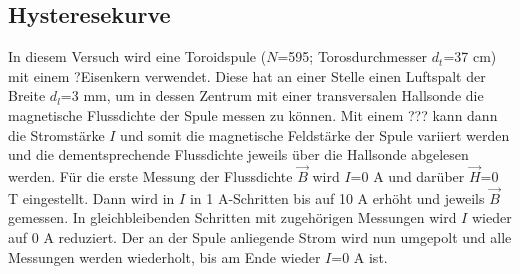     \subsection{Hysteresekurve}

        In diesem Versuch wird eine Toroidspule ($N$=595; Torosdurchmesser $d_t$=37 \si{\centi\meter}) mit einem ?Eisenkern
        verwendet. Diese hat an einer Stelle einen Luftspalt der Breite $d_l$=3 \si{\milli\meter}, um in 
        dessen Zentrum mit einer transversalen Hallsonde die magnetische Flussdichte der Spule messen zu können.
        Mit einem ??? kann dann die Stromstärke $I$ und somit die  magnetische Feldstärke der Spule 
        variiert werden und die dementsprechende Flussdichte jeweils über die Hallsonde abgelesen werden.
        Für die erste Messung der Flussdichte $\vec B$ wird $I$=0 \si{\ampere} und darüber $\vec H$=0 \si{\tesla}
        eingestellt. Dann wird in  $I$ in 1 \si{\ampere}-Schritten bis auf 10 \si{\ampere} erhöht und jeweils $\vec B$
        gemessen. In gleichbleibenden Schritten mit zugehörigen Messungen wird $I$ wieder auf 0 \si{\ampere}
        reduziert. Der an der Spule anliegende Strom wird nun umgepolt und alle Messungen werden
        wiederholt, bis am Ende wieder $I$=0 \si{\ampere} ist.

        
        

        

        

